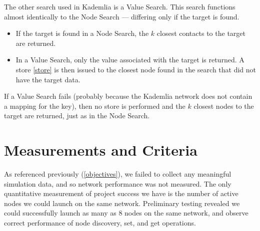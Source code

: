 \documentclass[12pt]{report}
\begin{document}
        The other search used in Kademlia is a Value Search. This search
        functions almost identically to the Node Search --- differing only if
        the target is found. 
        \begin{itemize}
            \item If the target is found in a Node Search, the $k$ closest
                contacts to the target are returned. 
            \item In a Value Search, only the value associated with the target
                is returned. A store \ref{store} is then issued to the closest
                node found in the search that did not have the target data. 
        \end{itemize}
        If a Value Search fails (probably because the Kademlia network does not
        contain a mapping for the key), then no store is performed and the $k$
        closest nodes to the target are returned, just as in the Node Search.

    \section{Measurements and Criteria}
    As referenced previously (\ref{objectives}), we failed to collect any
    meaningful simulation data, and so network performance was not measured.
    The only quantitative measurement of project success we have is the number
    of active nodes we could launch on the same network.  Preliminary testing
    revealed we could successfully launch as many as 8 nodes on the same
    network, and observe correct performance of node discovery, set, and get
    operations.
\end{document}
